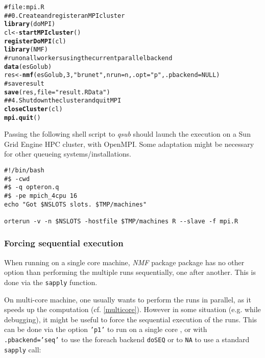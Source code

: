 \documentclass[a4paper]{article}\usepackage{graphicx, color}
\makeatletter
\newcommand{\hlfunctioncall}[1]{\textcolor[rgb]{0.501960784313725,0,0.329411764705882}{\textbf{#1}}}%
\newcommand{\hlstring}[1]{\textcolor[rgb]{0.6,0.6,1}{#1}}%
\newcommand{\hlcomment}[1]{\textcolor[rgb]{0.180392156862745,0.6,0.341176470588235}{#1}}%
\newenvironment{kframe}{%
 \def\at@end@of@kframe{}%
 \ifinner\ifhmode%
  \def\at@end@of@kframe{\end{minipage}}%
  \begin{minipage}{\columnwidth}%
 \fi\fi%
 \def\FrameCommand##1{\hskip\@totalleftmargin \hskip-\fboxsep
 \colorbox{shadecolor}{##1}\hskip-\fboxsep
     \hskip-\linewidth \hskip-\@totalleftmargin \hskip\columnwidth}%
 \MakeFramed {\advance\hsize-\width
   \@totalleftmargin\z@ \linewidth\hsize
   \@setminipage}}%
 {\par\unskip\endMakeFramed%
 \at@end@of@kframe}
\newenvironment{knitrout}{}{} %
\let\code=\texttt
\newcommand{\pkgname}[1]{\textit{#1}\xspace}
\newcommand{\Rpkg}[1]{\pkgname{#1} package\xspace}
\newcommand{\nmfpack}{\Rpkg{NMF}}
\makeatother
\begin{document}
\begin{knitrout}
\color{fgcolor}\begin{kframe}
\begin{alltt}
\hlcomment{# file: mpi.R}
\hlcomment{## 0. Create and register an MPI cluster}
\hlfunctioncall{library}(doMPI)
cl <- \hlfunctioncall{startMPIcluster}()
\hlfunctioncall{registerDoMPI}(cl)
\hlfunctioncall{library}(NMF)
\hlcomment{# run on all workers using the current parallel backend}
\hlfunctioncall{data}(esGolub)
res <- \hlfunctioncall{nmf}(esGolub, 3, \hlstring{"brunet"}, nrun = n, .opt = \hlstring{"p"}, .pbackend = NULL)
\hlcomment{# save result}
\hlfunctioncall{save}(res, file = \hlstring{"result.RData"})
\hlcomment{## 4. Shutdown the cluster and quit MPI}
\hlfunctioncall{closeCluster}(cl)
\hlfunctioncall{mpi.quit}()
\end{alltt}
\end{kframe}
\end{knitrout}


Passing the following shell script to \emph{qsub} should launch the execution on a Sun Grid Engine HPC cluster, with OpenMPI.
Some adaptation might be necessary for other queueing systems/installations.

\begin{shaded}
\small
\begin{verbatim}
#!/bin/bash
#$ -cwd 
#$ -q opteron.q
#$ -pe mpich_4cpu 16
echo "Got $NSLOTS slots. $TMP/machines"

orterun -v -n $NSLOTS -hostfile $TMP/machines R --slave -f mpi.R
\end{verbatim}
\end{shaded}

\subsubsection{Forcing sequential execution}
When running on a single core machine, \nmfpack package has no other option than performing the multiple runs sequentially, one after another. 
This is done via the \code{sapply} function.

On multi-core machine, one usually wants to perform the runs in parallel, as it speeds up the computation (cf. \cref{multicore}).
However in some situation (e.g. while debugging), it might be useful to force the sequential execution of the runs. 
This can be done via the option \code{'p1'} to run on a single core , or with
\code{.pbackend='seq'} to use the foreach backend \code{doSEQ} or to \code{NA} to use a standard \code{sapply} call:
\end{document}

